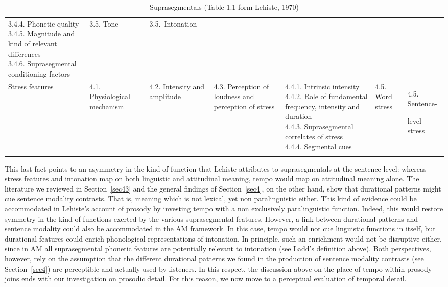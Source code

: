 \begin{landscape}
\begin{table}[p]
\begin{tabular}{lp{1.8cm}p{2.7cm}p{2cm}llp{1.6cm}}
{3.4.4. Phonetic quality \\
3.4.5. Magnitude and kind of relevant differences\\
3.4.6. Suprasegmental conditioning factors \\
}
& {3.5. Tone} & \mbox{3.5. Intonation} \\
{Stress features} & {\raggedright 4.1. Physiological mechanism} & {4.2. Intensity and amplitude} & {4.3. Perception of loudness and perception of stress} & \parbox[t]{3cm}{\raggedright 4.4.1. Intrinsic intensity \\
4.4.2. Role of fundamental frequency, intensity and duration\\
4.4.3. Suprasegmental correlates of stress\\
4.4.4. Segmental cues\\
}
& {4.5. Word stress} & {\raggedright 4.5. Sentence-} level stress \\
\mybottomrule
\end{tabular}
\caption{Suprasegmentals (Table 1.1 form Lehiste, 1970)}
\label{tab51}\end{table}
\end{landscape}

This last fact points to an asymmetry in the kind of function that Lehiste attributes to suprasegmentals at the sentence level: whereas stress features and intonation map on both linguistic and attitudinal meaning, tempo would map on attitudinal meaning alone.
The literature we reviewed in Section~\ref{sec43} and the general findings of Section~\ref{sec4}, on the other hand, show that durational patterns might cue sentence modality contrasts. That is, meaning which is not lexical, yet non paralinguistic either. This kind of evidence could be accommodated in Lehiste's account of prosody by investing tempo with a non exclusively paralinguistic function. Indeed, this would restore symmetry in the kind of functions exerted by the various suprasegmental features. However, a link between durational patterns and sentence modality could also be accommodated in the AM framework. In this case, tempo would not cue linguistic functions in itself, but durational features could enrich phonological representations of intonation. In principle, such an enrichment would not be disruptive either, since in AM all suprasegmental phonetic features are potentially relevant to intonation (see Ladd's definition above).
Both perspectives, however, rely on the assumption that the different durational patterns we found in the production of sentence modality contrasts (see Section~\ref{sec4}) are perceptible and actually used by listeners. In this respect, the discussion above on the place of tempo within prosody joins ends with our investigation on prosodic detail. For this reason, we now move to a perceptual evaluation of temporal detail.
